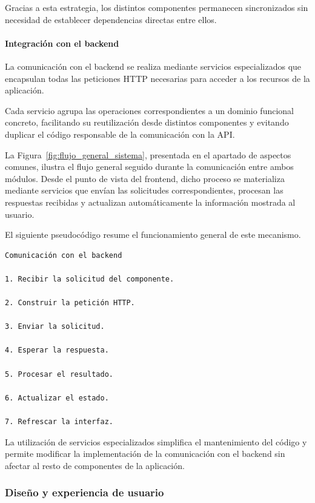 Gracias a esta estrategia, los distintos componentes permanecen sincronizados sin necesidad de establecer dependencias directas entre ellos.

\paragraph{Integración con el backend}

La comunicación con el backend se realiza mediante servicios especializados que encapsulan todas las peticiones HTTP necesarias para acceder a los recursos de la aplicación.

Cada servicio agrupa las operaciones correspondientes a un dominio funcional concreto, facilitando su reutilización desde distintos componentes y evitando duplicar el código responsable de la comunicación con la API.

La Figura~\ref{fig:flujo_general_sistema}, presentada en el apartado de aspectos comunes, ilustra el flujo general seguido durante la comunicación entre ambos módulos. Desde el punto de vista del frontend, dicho proceso se materializa mediante servicios que envían las solicitudes correspondientes, procesan las respuestas recibidas y actualizan automáticamente la información mostrada al usuario.

El siguiente pseudocódigo resume el funcionamiento general de este mecanismo.

\begin{Verbatim}[frame=single, fontsize=\small]
Comunicación con el backend

1. Recibir la solicitud del componente.

2. Construir la petición HTTP.

3. Enviar la solicitud.

4. Esperar la respuesta.

5. Procesar el resultado.

6. Actualizar el estado.

7. Refrescar la interfaz.
\end{Verbatim}

La utilización de servicios especializados simplifica el mantenimiento del código y permite modificar la implementación de la comunicación con el backend sin afectar al resto de componentes de la aplicación.

\subsubsection{Diseño y experiencia de usuario}

